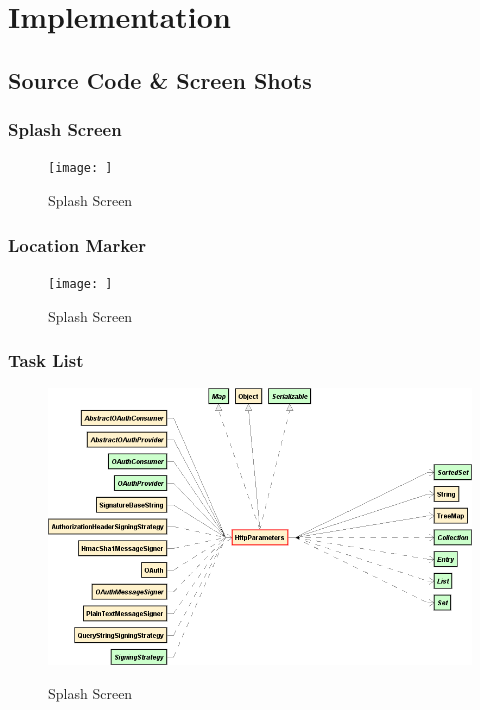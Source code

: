 
\chapter{Implementation}






\section{Source Code & Screen Shots}

\subsection{Splash Screen}

\begin{figure} [ht]
\centering
\texttt{[image: ]}\\
\caption{Splash Screen}
\label{the-label-for-cross-referencing}
\end{figure}




\subsection{Location Marker}

\begin{figure} [ht]
\centering
\texttt{[image: ]}\\
\caption{Splash Screen}
\label{the-label-for-cross-referencing}
\end{figure}



\subsection{Task List}

\begin{figure} [ht]
\centering
\includegraphics[scale=0.4]{images/http}\\
\caption{Splash Screen}
\label{the-label-for-cross-referencing}
\end{figure}

